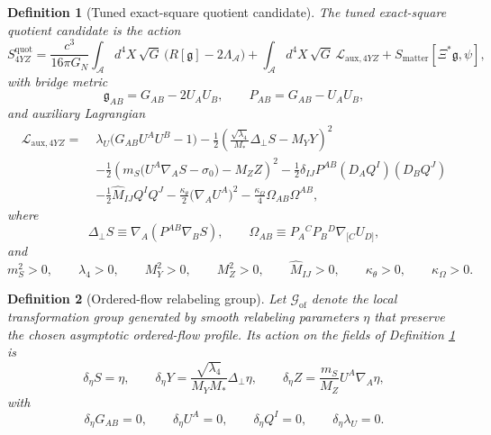 \documentclass[11pt]{article}
\newcommand{\Sub}{\mathcal{A}}
\newcommand{\BridgeMetric}{\mathfrak{g}}
\newcommand{\GaugeGroup}{\mathscr G_{\mathrm{of}}}
\newtheorem{definition}{Definition}
\begin{document}
\begin{definition}[Tuned exact-square quotient candidate]
\label{def:candidate}
The \emph{tuned exact-square quotient candidate} is the action
\begin{equation}
S_{4YZ}^{\mathrm{quot}}
=
\frac{c^3}{16\pi G_N}
\int_{\Sub} d^4X\,\sqrt{G}\,\bigl(R[\BridgeMetric]-2\Lambda_{\Sub}\bigr)
+\int_{\Sub} d^4X\,\sqrt{G}\,\mathcal L_{\mathrm{aux},4YZ}
+S_{\mathrm{matter}}[\Xi^*\BridgeMetric,\psi],
\label{eq:S4YZ}
\end{equation}
with bridge metric
\begin{equation}
\BridgeMetric_{AB}=G_{AB}-2U_AU_B,
\qquad
P_{AB}=G_{AB}-U_AU_B,
\label{eq:bridge}
\end{equation}
and auxiliary Lagrangian
\begin{align}
\mathcal L_{\mathrm{aux},4YZ}
=\;&
\lambda_U\bigl(G_{AB}U^AU^B-1\bigr)
-\frac12
\left(
\frac{\sqrt{\lambda_4}}{M_*}\Delta_\perp S-M_YY
\right)^2
\nonumber\\
&-\frac12
\left(
m_S\bigl(U^A\nabla_A S-\sigma_0\bigr)-M_ZZ
\right)^2
-\frac12\delta_{IJ}P^{AB}(D_AQ^I)(D_BQ^J)
\nonumber\\
&-\frac12\widehat M_{IJ}Q^IQ^J
-\frac{\kappa_\theta}{2}\bigl(\nabla_AU^A\bigr)^2
-\frac{\kappa_\Omega}{4}\Omega_{AB}\Omega^{AB},
\label{eq:L4YZ}
\end{align}
where
\begin{equation}
\Delta_\perp S\equiv \nabla_A(P^{AB}\nabla_BS),
\qquad
\Omega_{AB}\equiv P_A{}^CP_B{}^D\nabla_{[C}U_{D]},
\label{eq:defops}
\end{equation}
and
\begin{equation}
m_S^2>0,
\qquad
\lambda_4>0,
\qquad
M_Y^2>0,
\qquad
M_Z^2>0,
\qquad
\widehat M_{IJ}>0,
\qquad
\kappa_\theta>0,
\qquad
\kappa_\Omega>0.
\label{eq:positivity}
\end{equation}
\end{definition}

\begin{definition}[Ordered-flow relabeling group]
\label{def:gauge}
Let \(\GaugeGroup\) denote the local transformation group generated by smooth relabeling parameters \(\eta\) that preserve the chosen asymptotic ordered-flow profile. Its action on the fields of Definition \ref{def:candidate} is
\begin{equation}
\delta_\eta S=\eta,
\qquad
\delta_\eta Y=\frac{\sqrt{\lambda_4}}{M_YM_*}\Delta_\perp\eta,
\qquad
\delta_\eta Z=\frac{m_S}{M_Z}U^A\nabla_A\eta,
\label{eq:gauge}
\end{equation}
with
\begin{equation}
\delta_\eta G_{AB}=0,
\qquad
\delta_\eta U^A=0,
\qquad
\delta_\eta Q^I=0,
\qquad
\delta_\eta \lambda_U=0.
\label{eq:gaugefixed}
\end{equation}
\end{definition}
\end{document}
